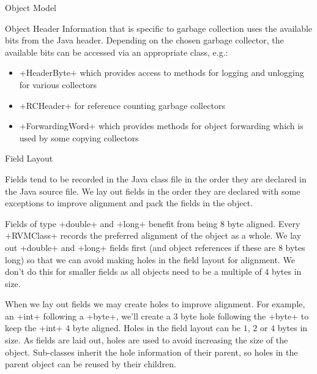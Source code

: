 \begin{section}{Object Model}
\begin{subsection}{Object Header}
Information that is specific to garbage collection uses the available bits from the Java header. Depending on the chosen garbage collector, the available bits can be accessed via an appropriate class, e.g.:
\begin{itemize}
  \item \spverb+HeaderByte+ which provides access to methods for logging and unlogging for various collectors
  \item \spverb+RCHeader+ for reference counting garbage collectors
  \item \spverb+ForwardingWord+ which provides methods for object forwarding which is used by some copying collectors
\end{itemize}

\end{subsection}

\begin{subsection}{Field Layout}

Fields tend to be recorded in the Java class file in the order they are declared in the Java source file. We lay out fields in the order they are declared with some exceptions to improve alignment and pack the fields in the object.

Fields of type \spverb+double+ and \spverb+long+ benefit from being $8$ byte aligned. Every \spverb+RVMClass+ records the preferred alignment of the object as a whole. We lay out \spverb+double+ and \spverb+long+ fields first (and object references if these are $8$ bytes long) so that we can avoid making holes in the field layout for alignment. We don't do this for smaller fields as all objects need to be a multiple of $4$ bytes in size.

When we lay out fields we may create holes to improve alignment. For example, an \spverb+int+ following a \spverb+byte+, we'll create a $3$ byte hole following the \spverb+byte+ to keep the \spverb+int+ $4$ byte aligned. Holes in the field layout can be $1$, $2$ or $4$ bytes in size. As fields are laid out, holes are used to avoid increasing the size of the object. Sub-classes inherit the hole information of their parent, so holes in the parent object can be reused by their children. 

\end{subsection}

\end{section}
